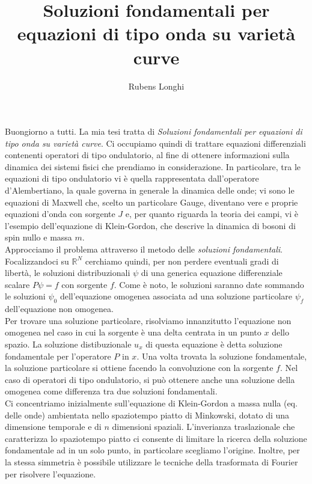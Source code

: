 \documentclass[11pt,a4paper]{article}
\title{Soluzioni fondamentali per equazioni di tipo onda su variet\`a curve}
\author{Rubens Longhi}
\date{}
\theoremstyle{classicthm}
\theoremstyle{classicthm}
\theoremstyle{definition}
\def\mR{{\mathbb R}}
\begin{document}
			
			\maketitle
			
			Buongiorno a tutti. La mia tesi tratta di \emph{Soluzioni fondamentali per equazioni di tipo onda su varietà curve}. Ci occupiamo quindi di trattare equazioni differenziali contenenti operatori di tipo ondulatorio, al fine di ottenere informazioni sulla dinamica dei sistemi fisici che prendiamo in considerazione. In particolare, tra le equazioni di tipo ondulatorio vi è quella rappresentata dall'operatore d'Alembertiano, la quale governa in generale la dinamica delle onde; vi sono le equazioni di Maxwell che, scelto un particolare Gauge, diventano vere e proprie equazioni d'onda con sorgente $J$ e, per quanto riguarda la teoria dei campi, vi è l'esempio dell'equazione di Klein-Gordon, che descrive la dinamica di bosoni di spin nullo e massa $m$.\\
			
			Approcciamo il problema attraverso il metodo delle \emph{soluzioni fondamentali}. Focalizzandoci su $\mR^N$ cerchiamo quindi, per non perdere eventuali gradi di libertà, le soluzioni distribuzionali $\psi$ di una generica equazione differenziale scalare $P\psi=f$ con sorgente $f$. Come è noto, le soluzioni saranno date sommando le soluzioni $\psi_0$ dell'equazione omogenea associata ad una soluzione particolare $\psi_f$ dell'equazione non omogenea.\\
			
			Per trovare una soluzione particolare, risolviamo innanzitutto l'equazione non omogenea nel caso in cui la sorgente è una delta centrata in un punto $x$ dello spazio. La soluzione distibuzionale $u_x$ di questa equazione è detta soluzione fondamentale per l'operatore $P$ in $x$. Una volta trovata la soluzione fondamentale, la soluzione particolare si ottiene facendo la convoluzione con la sorgente $f$. Nel caso di operatori di tipo ondulatorio, si può ottenere anche una soluzione della omogenea come differenza tra due soluzioni fondamentali.\\
			
			Ci concentriamo inizialmente sull'equazione di Klein-Gordon a massa nulla (eq. delle onde) ambientata nello spaziotempo piatto di Minkowski, dotato di una dimensione temporale e di $n$ dimensioni spaziali. L'inverianza traslazionale che caratterizza lo spaziotempo piatto ci consente di limitare la ricerca della soluzione fondamentale ad in un solo punto, in particolare scegliamo l'origine. Inoltre, per la stessa simmetria è possibile utilizzare le tecniche della trasformata di Fourier per risolvere l'equazione.\\
			
\end{document}
